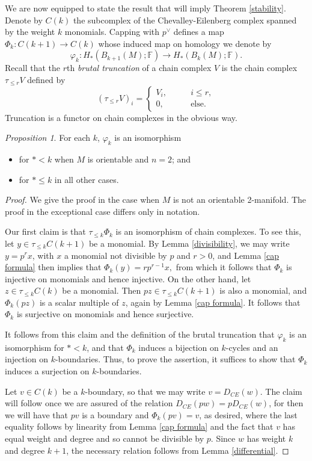 \documentclass{compositio}
\theoremstyle{definition}\newtheorem{definition}{Definition}[section]
\theoremstyle{theorem}\newtheorem{lemma}[definition]{Lemma}
\theoremstyle{remark}\newtheorem*{conventions}{Conventions}
\theoremstyle{remark}\newtheorem*{acknowledgments}{Acknowledgments}
\theoremstyle{remark}\newtheorem*{outline}{Outline}
\theoremstyle{remark}\newtheorem*{questions}{Questions}
\theoremstyle{remark}\newtheorem{example}[definition]{Example}
\theoremstyle{definition}\newtheorem{construction}[definition]{Construction}
\theoremstyle{definition}\newtheorem*{convention}{Convention}
\theoremstyle{definition}\newtheorem*{conjecture}{Conjecture}
\theoremstyle{theorem}\newtheorem{theorem}[definition]{Theorem}
\theoremstyle{theorem}\newtheorem{paradigm}[definition]{Paradigm}
\theoremstyle{remark}\newtheorem{remark}[definition]{Remark}
\theoremstyle{corollary}\newtheorem{corollary}[definition]{Corollary}
\theoremstyle{theorem}\newtheorem{proposition}[definition]{Proposition}
\theoremstyle{definition}\newtheorem{question}[definition]{Question}
\begin{document}
We are now equipped to state the result that will imply Theorem \ref{stability}. Denote by $C(k)$ the subcomplex of the Chevalley-Eilenberg complex spanned by the weight $k$ monomials. Capping with $p^\vee$ defines a map $\Phi_k:C(k+1)\to C(k)$ whose induced map on homology we denote by $$\varphi_k:H_*(B_{k+1}(M);\mathbb{F})\to H_*(B_{k}(M);\mathbb{F}).$$ Recall that the $r$th \emph{brutal truncation} of a chain complex $V$ is the chain complex $\tau_{\leq r}V$ defined by $$(\tau_{\leq r}V)_i=\begin{cases}
V_i,\qquad &i\leq r,\\
0,\qquad &\text{else.}
\end{cases}$$ Truncation is a functor on chain complexes in the obvious way.

\begin{proposition}
For each $k$, $\varphi_k$ is an isomorphism \begin{itemize}
\item for $*<k$ when $M$ is orientable and $n=2$; and
\item for $*\leq k$ in all other cases.
\end{itemize}
\end{proposition}
\begin{proof}
We give the proof in the case when $M$ is not an orientable 2-manifold. The proof in the exceptional case differs only in notation.

Our first claim is that $\tau_{\leq k}\Phi_k$ is an isomorphism of chain complexes. To see this, let $y\in \tau_{\leq k}C(k+1)$ be a monomial. By Lemma \ref{divisibility}, we may write $y=p^rx$, with $x$ a monomial not divisible by $p$ and $r>0$, and Lemma \ref{cap formula} then implies that $\Phi_k(y)=rp^{r-1}x,$ from which it follows that $\Phi_k$ is injective on monomials and hence injective. On the other hand, let $z\in \tau_{\leq k}C(k)$ be a monomial. Then $pz\in \tau_{\leq k}C(k+1)$ is also a monomial, and $\Phi_k(pz)$ is a scalar multiple of $z$, again by Lemma \ref{cap formula}. It follows that $\Phi_k$ is surjective on monomials and hence surjective.

It follows from this claim and the definition of the brutal truncation that $\varphi_k$ is an isomorphism for $*<k$, and that $\Phi_k$ induces a bijection on $k$-cycles and an injection on $k$-boundaries. Thus, to prove the assertion, it suffices to show that $\Phi_k$ induces a surjection on $k$-boundaries. 

Let $v\in C(k)$ be a $k$-boundary, so that we may write $v=D_{CE}(w)$. The claim will follow once we are assured of the relation $D_{CE}(pw)=pD_{CE}(w)$, for then we will have that $pv$ is a boundary and $\Phi_k(pv)=v$, as desired, where the last equality follows by linearity from Lemma \ref{cap formula} and the fact that $v$ has equal weight and degree and so cannot be divisible by $p$. Since $w$ has weight $k$ and degree $k+1$, the necessary relation follows from Lemma \ref{differential}.

\end{proof}
\end{document}
